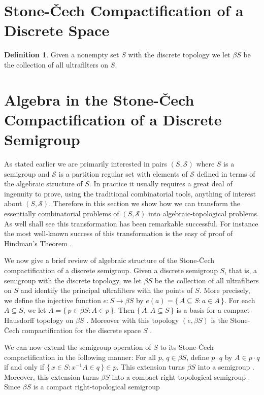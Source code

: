 \documentclass[12pt]{article}
\theoremstyle{plain}
\theoremstyle{definition}
\newtheorem{defn}[thm]{Definition}
\newcommand{\calS}{\mathcal{S}}
\begin{document}
\section{Stone-\v{C}ech Compactification of a Discrete Space}

\begin{defn}
  Given a nonempty set $S$ with the discrete topology we let $\beta S$ be the collection of all ultrafilters on $S$. 
\end{defn}

\section{Algebra in the Stone-\v{C}ech Compactification of a Discrete Semigroup}

As stated earlier we are primarily interested in pairs $(S, \calS)$ where $S$ is a semigroup and $\calS$ is a partition regular set with elements of $\calS$ defined in terms of the algebraic structure of $S$.
In practice it usually requires a great deal of ingenuity to prove, using the traditional combinatorial tools, anything of interest about $(S, \calS)$. 
Therefore in this section we show how we can transform the essentially combinatorial problems of $(S, \calS)$ into algebraic-topological problems. 
As well shall see this transformation has been remarkable successful.
For instance the most well-known success of this transformation is the easy of proof of Hindman's Theorem \cite[Corollary 5.9]{Hindman:1998fk}.

We now give a brief review of algebraic structure of the Stone-\v{C}ech compactification of a discrete semigroup.  
Given a discrete semigroup $S$, that is, a semigroup with the discrete topology, we let $\beta S$ be the collection of all ultrafilters on $S$ and identify the principal ultrafilters with the points of $S$.
More precisely, we define the injective function $e \colon S \to \beta S$ by $e(a) = \{\, A \subseteq S : a \in A \,\}$.
For each $A \subseteq S$, we let $\overline{A} = \{\, p \in \beta S : A \in p \,\}$.
Then $\{\, \overline{A} : A \subseteq S \,\}$ is a basis for a compact Hausdorff topology on $\beta S$ \cite[Theorem 3.18(a)]{Hindman:1998fk}. 
Moreover with this topology $(e, \beta S)$ is the Stone-\v{C}ech compactification for the discrete space $S$ \cite[Theorem 3.27]{Hindman:1998fk}. 

We can now extend the semigroup operation of $S$ to its Stone-\v{C}ech compactification in the following manner:  For all $p$, $q \in \beta S$, define $p \cdot q$ by $A \in p \cdot q$ if and only if $\{\, x \in S : x^{-1}A \in q \,\} \in p$. 
This extension turns $\beta S$ into a semigroup \cite[Theorem 4.1, Theorem 4.4, and Theorem 4.12]{Hindman:1998fk}. 
Moreover, this extension turns $\beta S$ into a compact right-topological semigroup \cite[Theorem 4.1(b)]{Hindman:1998fk}.
Since $\beta S$ is a compact right-topological semigroup 
\end{document}
